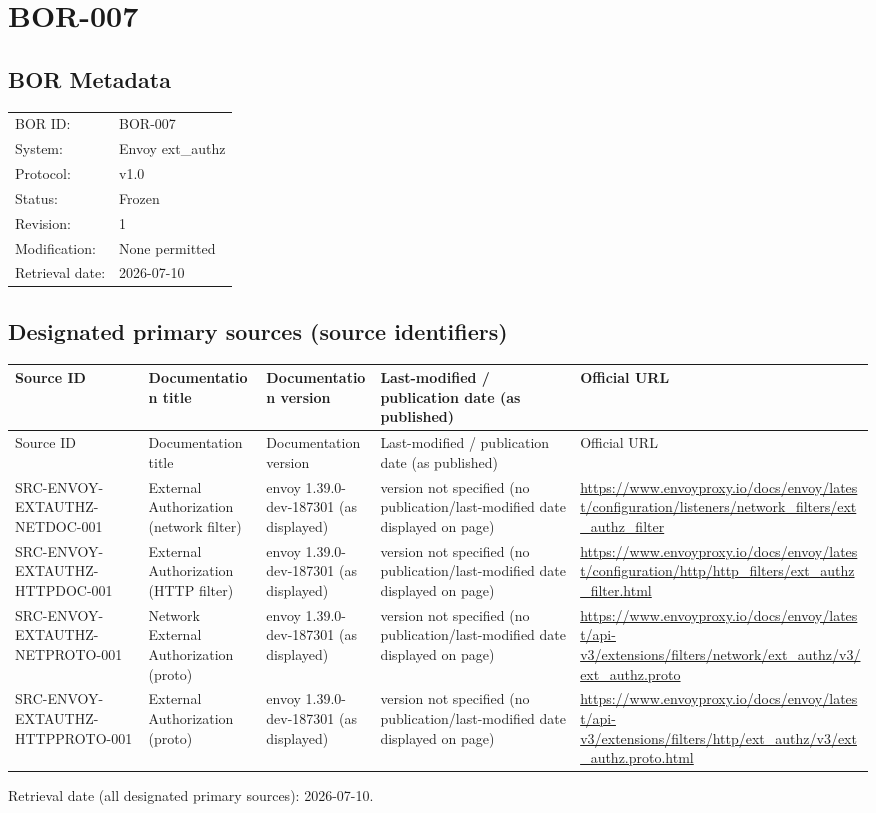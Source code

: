 \documentclass{article}
\begin{document}
\newpage
\section*{BOR-007}

\subsection*{BOR Metadata}
\begin{tabular}{@{}ll@{}}
\toprule
BOR ID: & BOR-007\\
System: & Envoy ext\_authz\\
Protocol: & v1.0\\
Status: & Frozen\\
Revision: & 1\\
Modification: & None permitted\\
Retrieval date: & 2026-07-10\\
\bottomrule
\end{tabular}

\subsection*{Designated primary sources (source identifiers)}
\begin{longtable}{@{}p{}p{}p{}p{}p{}@{}}
\toprule
Source ID & Documentation title & Documentation version & Last-modified / publication date (as published) & Official URL\\
\midrule
\endfirsthead
\toprule
Source ID & Documentation title & Documentation version & Last-modified / publication date (as published) & Official URL\\
\midrule
\endhead
SRC-ENVOY-EXTAUTHZ-NETDOC-001 & External Authorization (network filter) & envoy 1.39.0-dev-187301 (as displayed) & version not specified (no publication/last-modified date displayed on page) & \url{https://www.envoyproxy.io/docs/envoy/latest/configuration/listeners/network_filters/ext_authz_filter}\\
SRC-ENVOY-EXTAUTHZ-HTTPDOC-001 & External Authorization (HTTP filter) & envoy 1.39.0-dev-187301 (as displayed) & version not specified (no publication/last-modified date displayed on page) & \url{https://www.envoyproxy.io/docs/envoy/latest/configuration/http/http_filters/ext_authz_filter.html}\\
SRC-ENVOY-EXTAUTHZ-NETPROTO-001 & Network External Authorization (proto) & envoy 1.39.0-dev-187301 (as displayed) & version not specified (no publication/last-modified date displayed on page) & \url{https://www.envoyproxy.io/docs/envoy/latest/api-v3/extensions/filters/network/ext_authz/v3/ext_authz.proto}\\
SRC-ENVOY-EXTAUTHZ-HTTPPROTO-001 & External Authorization (proto) & envoy 1.39.0-dev-187301 (as displayed) & version not specified (no publication/last-modified date displayed on page) & \url{https://www.envoyproxy.io/docs/envoy/latest/api-v3/extensions/filters/http/ext_authz/v3/ext_authz.proto.html}\\
\bottomrule
\end{longtable}
Retrieval date (all designated primary sources): 2026-07-10.
\end{document}
